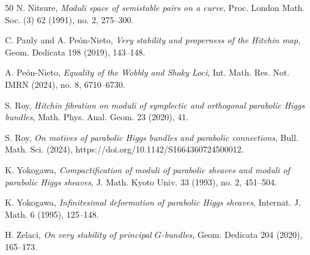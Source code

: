 \documentclass[11pt, reqno]{amsart}
\numberwithin{equation}{section}
\theoremstyle{definition}
\begin{document}
\begin{thebibliography}{50}
N. Nitsure,
\emph{Moduli space of semistable pairs on a curve},
Proc. London Math. Soc. (3) 62 (1991), no. 2, 275–300.

C. Pauly and A. Pe\'on-Nieto,
\emph{Very stability and properness of the Hitchin map},
Geom. Dedicata 198 (2019), 143–148.

A. Pe\'on-Nieto,
\emph{Equality of the Wobbly and Shaky Loci},
Int. Math. Res. Not. IMRN (2024), no. 8, 6710–6730.

S. Roy,
\emph{Hitchin fibration on moduli of symplectic and orthogonal parabolic Higgs bundles},
Math. Phys. Anal. Geom. 23 (2020), 41.

S. Roy,
\emph{On motives of parabolic Higgs bundles and parabolic connections},
Bull. Math. Sci. (2024), https://doi.org/10.1142/S1664360724500012.

K. Yokogawa,
\emph{Compactification of moduli of parabolic sheaves and moduli of parabolic Higgs sheaves},
J. Math. Kyoto Univ. 33 (1993), no. 2, 451–504.

K. Yokogawa,
\emph{Infinitesimal deformation of parabolic Higgs sheaves},
Internat. J. Math. 6 (1995), 125–148.

H. Zelaci,
\emph{On very stability of principal $G$-bundles},
Geom. Dedicata 204 (2020), 165–173.

\end{thebibliography}
\end{document}
